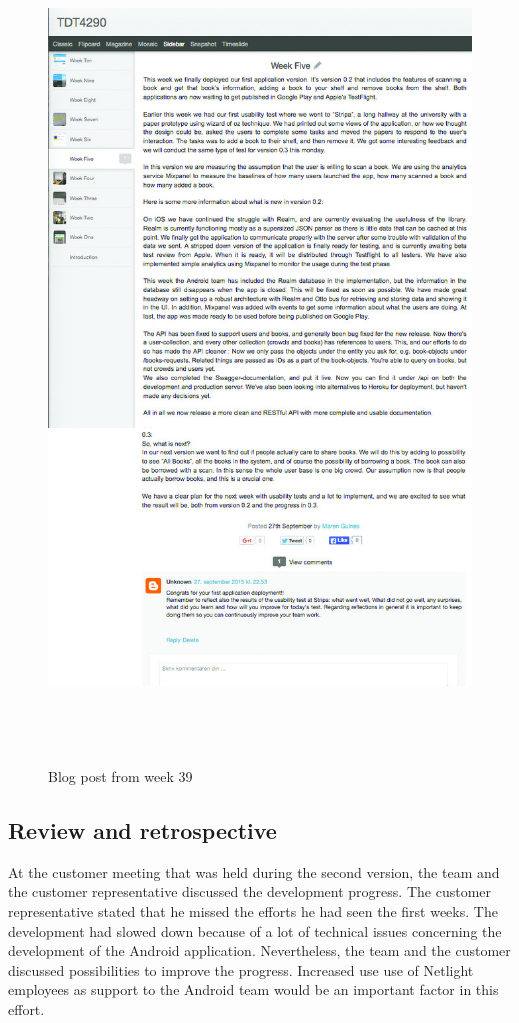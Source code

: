 \begin{figure}
\centering
\includegraphics[height=22cm]{figs/v02/WeekFive.jpg}
\caption{Blog post from week 39}
\label{fig:week-five}
\end{figure}


\subsection{Review and retrospective}

At the customer meeting that was held during the second version, the team and the customer representative discussed the development progress. The customer representative stated that he missed the efforts he had seen the first weeks. The development had slowed down because of a lot of technical issues concerning the development of the Android application. Nevertheless, the team and the customer discussed possibilities to improve the progress. Increased use use of Netlight employees as support to the Android team would be an important factor in this effort. 

